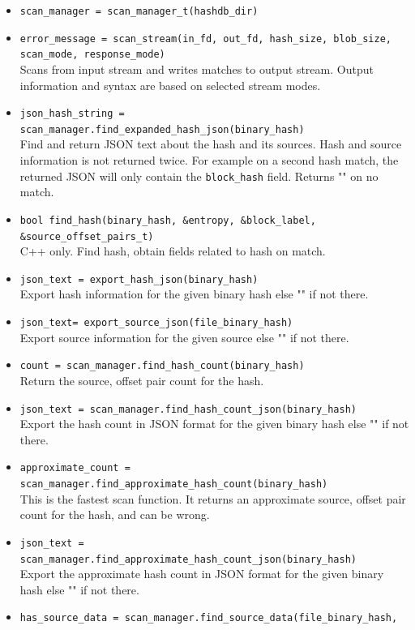 \documentclass[11pt,fleqn]{article} %
\begin{document}
\begin{itemize}
\item \verb+scan_manager = scan_manager_t(hashdb_dir)+
\item \verb+error_message = scan_stream(in_fd, out_fd, hash_size, blob_size,+\\
\verb+scan_mode, response_mode)+\\
Scans from input stream and writes matches to output stream. Output information and syntax are based on selected stream modes.
\item \verb+json_hash_string = scan_manager.find_expanded_hash_json(binary_hash)+\\
Find and return JSON text about the hash and its sources. Hash and source information is not returned twice. For example on a second hash match, the returned JSON will only contain the \verb+block_hash+ field. Returns "" on no match.
\item \verb+bool find_hash(binary_hash, &entropy, &block_label, &source_offset_pairs_t)+\\
C++ only. Find hash, obtain fields related to hash on match.
\item \verb+json_text = export_hash_json(binary_hash)+\\
Export hash information for the given binary hash else "" if not there.
\item \verb+json_text= export_source_json(file_binary_hash)+\\
Export source information for the given source else "" if not there.
\item \verb+count = scan_manager.find_hash_count(binary_hash)+\\
Return the source, offset pair count for the hash.
\item \verb+json_text = scan_manager.find_hash_count_json(binary_hash)+\\
Export the hash count in JSON format for the given binary hash else "" if not there.
\item \verb+approximate_count = scan_manager.find_approximate_hash_count(binary_hash)+\\
This is the fastest scan function. It returns an approximate source, offset pair count for the hash, and can be wrong.
\item \verb+json_text = scan_manager.find_approximate_hash_count_json(binary_hash)+\\
Export the approximate hash count in JSON format for the given binary hash else "" if not there.
\item \verb+has_source_data = scan_manager.find_source_data(file_binary_hash,+\\

\end{itemize}
\end{document}
